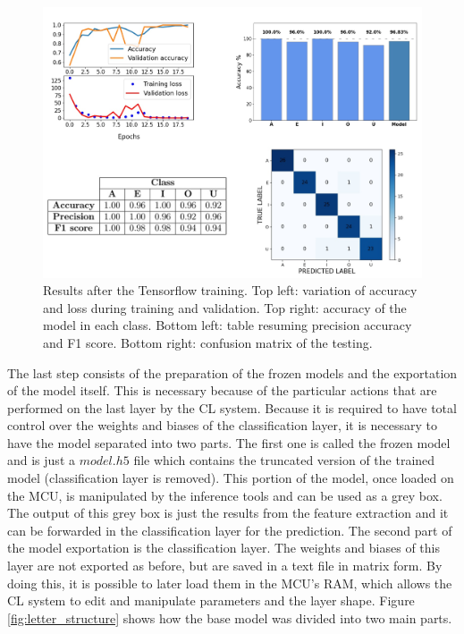 \documentclass[12pt]{report}
\begin{document}
\begin{figure}[h!]
    \centering
    \includegraphics[width=130mm]{Figures/Chapter4/training_letters.png} 
    \caption{Results after the Tensorflow training. Top left: variation of accuracy and loss during training and validation. Top right: accuracy of the model in each class. Bottom left: table resuming precision accuracy and F1 score. Bottom right: confusion matrix of the testing.}
    \label{fig:training_letters}    
\end{figure}

The last step consists of the preparation of the frozen models and the exportation of the model itself. This is necessary because of the particular actions that are performed on the last layer by the CL system. Because it is required to have total control over the weights and biases of the classification layer, it is necessary to have the model separated into two parts. The first one is called the frozen model and is just a $model.h5$ file which contains the truncated version of the trained model (classification layer is removed). This portion of the model, once loaded on the MCU, is manipulated by the inference tools and can be used as a grey box. The output of this grey box is just the results from the feature extraction and it can be forwarded in the classification layer for the prediction.
The second part of the model exportation is the classification layer. The weights and biases of this layer are not exported as before, but are saved in a text file in matrix form. By doing this, it is possible to later load them in the MCU's RAM, which allows the CL system to edit and manipulate parameters and the layer shape. 
Figure \ref{fig:letter_structure} shows how the base model was divided into two main parts.
\end{document}
